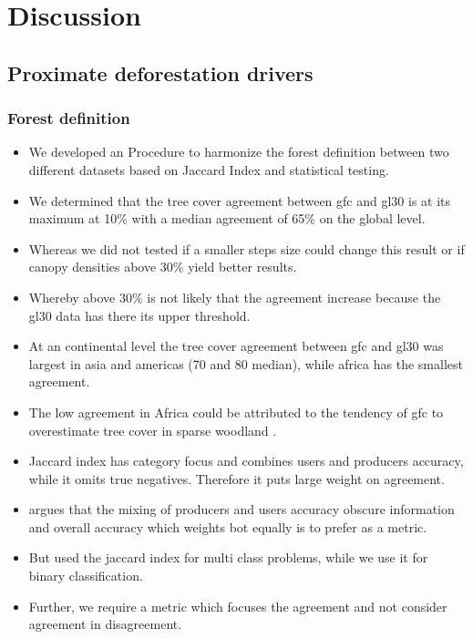 \chapter{Discussion}
\label{ch:discussion}
	\section{Proximate deforestation drivers}
	\label{sec:discussion_deforestation}

		\subsection{Forest definition}
		\label{subsec:discussion_forest_definition}
			\begin{itemize}
				\item We developed an Procedure to harmonize the forest definition between two different datasets based on Jaccard Index and statistical testing.
				\item We determined that the tree cover agreement between gfc and gl30 is at its maximum at 10\% with a median agreement of 65\% on the global level.
				\item Whereas we did not tested if a smaller steps size could change this result or if canopy densities above 30\% yield better results.
				\item Whereby above 30\% is not likely that the agreement increase because the gl30 data has there its upper threshold.
				\item At an continental level the tree cover agreement between gfc and gl30 was largest in asia and americas (70 and 80 median), while africa has the smallest agreement.  
				\item The low agreement in Africa could be attributed to the tendency of gfc to overestimate tree cover in sparse woodland \citep{Gross2017}.
				\item Jaccard index has category focus and combines users and producers accuracy, while it omits true negatives. Therefore it puts large weight on agreement.
				\item \citep{Li2017a} argues that the mixing of producers and users accuracy obscure information and overall accuracy which weights bot equally is to prefer as a metric.
				\item But \citep{Li2017a} used the jaccard index for multi class problems, while we use it for binary classification.
				\item Further, we require a metric which focuses the agreement and not consider agreement in disagreement.

\end{itemize}
